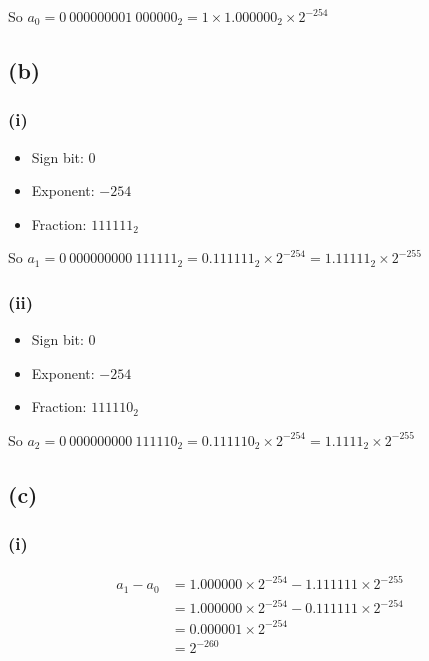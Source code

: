 \documentclass[12pt]{article}
\begin{document}
So $a_0 = 0\ 000000001\ 000000_2 = 1 \times 1.000000_2 \times 2^{-254}$

\subsection*{(b)}

\subsubsection*{(i)}

\begin{itemize}
    \item Sign bit: 0
    \item Exponent: $-254$
    \item Fraction: $111111_2$
\end{itemize}

So $a_1 = 0\ 000000000\ 111111_2 = 0.111111_2 \times 2^{-254} = 1.11111_2 \times 2^{-255}$

\subsubsection*{(ii)}

\begin{itemize}
    \item Sign bit: 0
    \item Exponent: $-254$
    \item Fraction: $111110_2$
\end{itemize}

So $a_2 = 0\ 000000000\ 111110_2 = 0.111110_2 \times 2^{-254} = 1.1111_2 \times 2^{-255}$

\subsection*{(c)}

\subsubsection*{(i)}

\begin{align*}
a_1 - a_0 &= 1.000000 \times 2^{-254} - 1.111111 \times 2^{-255} \\
&= 1.000000 \times 2^{-254} - 0.111111 \times 2^{-254} \\
&= 0.000001 \times 2^{-254} \\
&= 2^{-260}
\end{align*}
\end{document}
